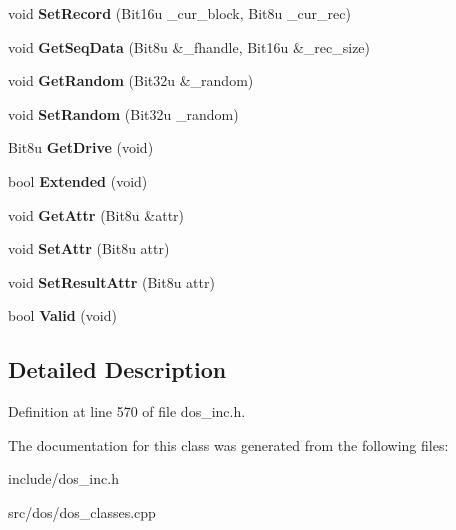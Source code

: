 \begin{DoxyCompactItemize}
\item 
\hypertarget{classDOS__FCB_aa4f8785c2b5e67e613e38a2663cc08b2}{void {\bfseries Set\-Record} (Bit16u \-\_\-cur\-\_\-block, Bit8u \-\_\-cur\-\_\-rec)}\label{classDOS__FCB_aa4f8785c2b5e67e613e38a2663cc08b2}

\item 
\hypertarget{classDOS__FCB_a2e9b07c8a0a281e21f6151e4766cd741}{void {\bfseries Get\-Seq\-Data} (Bit8u \&\-\_\-fhandle, Bit16u \&\-\_\-rec\-\_\-size)}\label{classDOS__FCB_a2e9b07c8a0a281e21f6151e4766cd741}

\item 
\hypertarget{classDOS__FCB_ab49248721f42da4974744a8810027230}{void {\bfseries Get\-Random} (Bit32u \&\-\_\-random)}\label{classDOS__FCB_ab49248721f42da4974744a8810027230}

\item 
\hypertarget{classDOS__FCB_aa6d6128bfcca69f73790e0e07be677da}{void {\bfseries Set\-Random} (Bit32u \-\_\-random)}\label{classDOS__FCB_aa6d6128bfcca69f73790e0e07be677da}

\item 
\hypertarget{classDOS__FCB_a6da07c697a956f04f9df2fa0cb9249ab}{Bit8u {\bfseries Get\-Drive} (void)}\label{classDOS__FCB_a6da07c697a956f04f9df2fa0cb9249ab}

\item 
\hypertarget{classDOS__FCB_ad4a466929e2135cbbf36cce3f93c1009}{bool {\bfseries Extended} (void)}\label{classDOS__FCB_ad4a466929e2135cbbf36cce3f93c1009}

\item 
\hypertarget{classDOS__FCB_aead0618722ff1f674547679cd38451ad}{void {\bfseries Get\-Attr} (Bit8u \&attr)}\label{classDOS__FCB_aead0618722ff1f674547679cd38451ad}

\item 
\hypertarget{classDOS__FCB_ac0a82ec6f3d72a69d54579fa640c5669}{void {\bfseries Set\-Attr} (Bit8u attr)}\label{classDOS__FCB_ac0a82ec6f3d72a69d54579fa640c5669}

\item 
\hypertarget{classDOS__FCB_a75db597566f524cb0de9dfc2be6a8c7f}{void {\bfseries Set\-Result\-Attr} (Bit8u attr)}\label{classDOS__FCB_a75db597566f524cb0de9dfc2be6a8c7f}

\item 
\hypertarget{classDOS__FCB_ab247afb9301a93fb192cd8d60acf6219}{bool {\bfseries Valid} (void)}\label{classDOS__FCB_ab247afb9301a93fb192cd8d60acf6219}

\end{DoxyCompactItemize}


\subsection{Detailed Description}


Definition at line 570 of file dos\-\_\-inc.\-h.



The documentation for this class was generated from the following files\-:\begin{DoxyCompactItemize}
\item 
include/dos\-\_\-inc.\-h\item 
src/dos/dos\-\_\-classes.\-cpp\end{DoxyCompactItemize}
